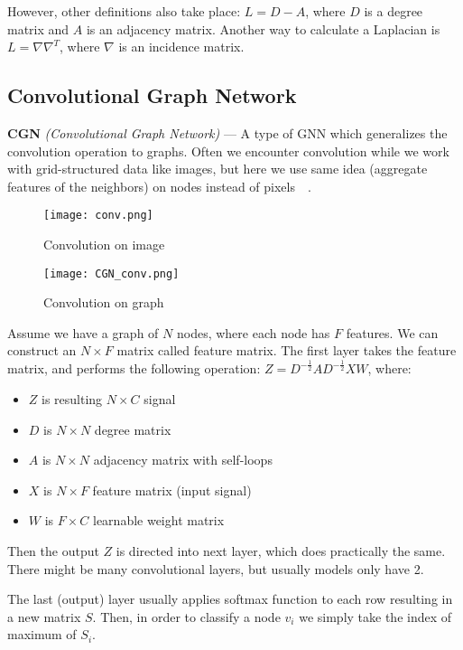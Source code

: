 However, other definitions also take place: $L = D - A$, where $D$ is a degree matrix and $A$ is an adjacency matrix.
Another way to calculate a Laplacian is $L = \nabla\nabla^{T}$, where $\nabla$ is an incidence matrix.


\subsection*{Convolutional Graph Network}

\textbf{CGN} \textit{(Convolutional Graph Network)} --- A type of GNN which generalizes the convolution operation to graphs.
Often we encounter convolution while we work with grid-structured data like images, but here we use same idea (aggregate features of the neighbors) on nodes instead of pixels~\cite{Wu_Pan_Chen_Long_Zhang_Yu_2021}~\cite{Kipf_Welling_2017}.

\begin{figure}[h]
	\begin{multicols}{2}
		\centering
		\texttt{[image: conv.png]}
		\caption{Convolution on image}

		\centering
		\texttt{[image: CGN\_conv.png]}
		\caption{Convolution on graph}
	\end{multicols}
\end{figure}

Assume we have a graph of $N$ nodes, where each node has $F$ features.
We can construct an $N \times F$ matrix called feature matrix.
The first layer takes the feature matrix, and performs the following operation: $Z = D^{-\frac{1}{2}} A D^{-\frac{1}{2}} X W$, where:
\begin{itemize}
	\item $Z$ is resulting $N \times C$ signal
	\item $D$ is $N \times N$ degree matrix
	\item $A$ is $N \times N$ adjacency matrix with self-loops
	\item $X$ is $N \times F$ feature matrix (input signal)
	\item $W$ is $F \times C$ learnable weight matrix
\end{itemize}

Then the output $Z$ is directed into next layer, which does practically the same.
There might be many convolutional layers, but usually models only have 2.

The last (output) layer usually applies softmax function to each row resulting in a new matrix $S$.
Then, in order to classify a node $v_i$ we simply take the index of maximum of $S_i$.

